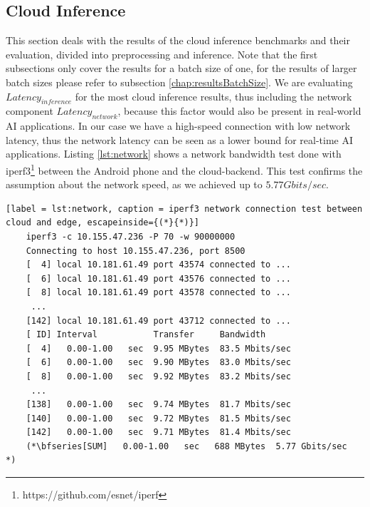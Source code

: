 \subsection{Cloud Inference}
\label{chap:CloudResults}
This section deals with the results of the cloud inference benchmarks and their evaluation, divided into preprocessing and inference.
Note that the first subsections only cover the results for a batch size of one, for the results of larger batch sizes please refer to subsection \ref{chap:resultsBatchSize}.
We are evaluating $Latency_{inference}$ for the most cloud inference results, thus including the network component $Latency_{network}$, because this factor would also be present in real-world AI applications. In our case we have a high-speed connection with low network latency, thus the network latency can be seen as a lower bound for real-time AI applications.
Listing \ref{lst:network} shows a network bandwidth test done with iperf3\footnote{https://github.com/esnet/iperf} between the Android phone and the cloud-backend. This test confirms the assumption about the network speed, as we achieved up to $5.77 Gbits/sec$.
\begin{lstlisting}[label = lst:network, caption = iperf3 network connection test between cloud and edge, escapeinside={(*}{*)}]
    iperf3 -c 10.155.47.236 -P 70 -w 90000000 
    Connecting to host 10.155.47.236, port 8500
    [  4] local 10.181.61.49 port 43574 connected to ...
    [  6] local 10.181.61.49 port 43576 connected to ...
    [  8] local 10.181.61.49 port 43578 connected to ...
     ...
    [142] local 10.181.61.49 port 43712 connected to ...
    [ ID] Interval           Transfer     Bandwidth
    [  4]   0.00-1.00   sec  9.95 MBytes  83.5 Mbits/sec                  
    [  6]   0.00-1.00   sec  9.90 MBytes  83.0 Mbits/sec                  
    [  8]   0.00-1.00   sec  9.92 MBytes  83.2 Mbits/sec                  
     ...     
    [138]   0.00-1.00   sec  9.74 MBytes  81.7 Mbits/sec                  
    [140]   0.00-1.00   sec  9.72 MBytes  81.5 Mbits/sec                  
    [142]   0.00-1.00   sec  9.71 MBytes  81.4 Mbits/sec                  
    (*\bfseries[SUM]   0.00-1.00   sec   688 MBytes  5.77 Gbits/sec  *)  

\end{lstlisting}
